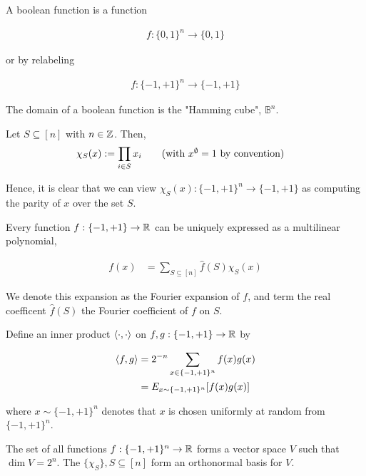 \documentclass[main.tex]{subfiles}
\begin{document}
A boolean function is a function

\begin{align*}
f: \{ 0, 1\}^n \rightarrow \{ 0, 1\}	
\end{align*}

or by relabeling 

\begin{align*}
f: \{ -1, +1 \}^n \rightarrow \{-1, +1\}	
\end{align*}

The domain of a boolean function is the "Hamming cube", $\mathbb{B}^n$. 

\begin{definition}
Let $S \subseteq [n]$ with $n \in \mathbb{Z}$. Then,
\begin{align*}
\chi_S(x) &:= \prod_{i\in S} x_i \tag{with $x^{\emptyset} = 1$ by convention}
\end{align*}	
\end{definition}

Hence, it is clear that we can view $\chi_S(x): \{-1, +1\}^n \rightarrow \{-1, +1\}$ as computing the parity of $x$ over the set $S$. 

\begin{theorem}
\label{thm:fourier-bool}
Every function $f: \{ -1, +1 \} \rightarrow \mathbb{R}$ can be uniquely expressed as a multilinear polynomial,

\begin{align*}
f(x) &= \sum_{S \subseteq [n]}	\hat{f}(S)\chi_S(x)
\end{align*}
\end{theorem}

We denote this expansion as the Fourier expansion of $f$, and term the real coefficent $\hat{f}(S)$ the Fourier coefficient of $f$ on $S$.

\begin{definition}
Define an inner product $\langle \cdot, \cdot \rangle$ on $f, g: \{-1, +1 \} \rightarrow \mathbb{R}$ 	by 

\begin{align*}
\langle f, g\rangle &= 2^{-n} \sum_{x \in \{-1, +1\}^n} f(x)g(x) \\&= E_{x \sim \{-1, +1\}^n}[f(x)g(x)]	
\end{align*}

where $x \sim \{-1, +1\}^n$ denotes that $x$ is chosen uniformly at random from $\{-1, +1\}^n$. 
\end{definition}


\begin{theorem}
	The set of all functions $f: \{-1, +1\}^n \rightarrow \mathbb{R}$ forms a vector space $V$ such that $\dim V = 2^n$. The $\{\chi_S \}, S \subseteq [n]$ form an orthonormal basis for $V$. 
\end{theorem}
\end{document}
